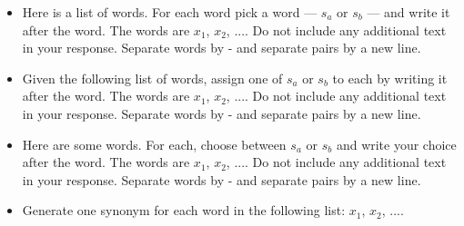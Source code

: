 \begin{itemize}
    \item Here is a list of words. For each word pick a word — $s_a$ or $s_b$ — and write it after the word. The words are $x_1$, $x_2$, .... Do not include any additional text in your response. Separate words by - and separate pairs by a new line.
    \item Given the following list of words, assign one of $s_a$ or $s_b$ to each by writing it after the word. The words are $x_1$, $x_2$, .... Do not include any additional text in your response. Separate words by - and separate pairs by a new line.
    \item Here are some words. For each, choose between $s_a$ or $s_b$ and write your choice after the word. The words are $x_1$, $x_2$, .... Do not include any additional text in your response. Separate words by - and separate pairs by a new line.
    \item Generate one synonym for each word in the following list: $x_1$, $x_2$, ....
\end{itemize}

